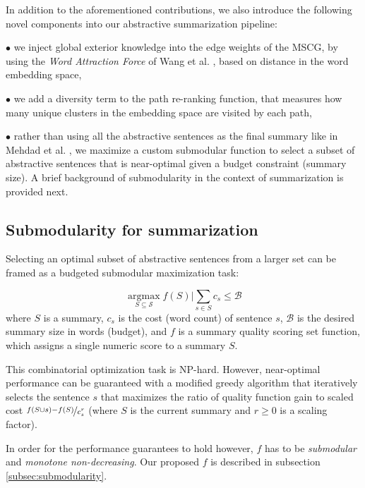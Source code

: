 \documentclass[11pt,a4paper]{article}
\begin{document}
\vspace{-.3cm}

In addition to the aforementioned contributions, we also introduce the following novel components into our abstractive summarization pipeline:

$\bullet$ we inject global exterior knowledge into the edge weights of the MSCG, by using the \textit{Word Attraction Force} of Wang et al. , based on distance in the word embedding space,

$\bullet$ we add a diversity term to the path re-ranking function, that measures how many unique clusters in the embedding space are visited by each path,

$\bullet$ rather than using all the abstractive sentences as the final summary like in Mehdad et al. , we maximize a custom submodular function to select a subset of abstractive sentences that is near-optimal given a budget constraint (summary size). A brief background of submodularity in the context of summarization is provided next.

\subsection{Submodularity for summarization \cite{lin2010multi,lin2012submodularity}}\label{sub:rel_sub}
Selecting an optimal subset of abstractive sentences from a larger set can be framed as a budgeted submodular maximization task:

\begin{equation}
\operatorname*{argmax}_{S \subseteq \mathcal{S}} f(S) | \sum_{s \in S} c_s\leq \mathcal{B}
\end{equation}
where $S$ is a summary, $c_s$ is the cost (word count) of sentence $s$, $\mathcal{B}$ is the desired summary size in words (budget), and $f$ is a summary quality scoring set function, which assigns a single numeric score to a summary $S$.

This combinatorial optimization task is NP-hard. However, near-optimal performance can be guaranteed with a modified greedy algorithm \cite{lin2010multi} that iteratively selects the sentence $s$ that maximizes the ratio of quality function gain to scaled cost $\nicefrac{f(S \cup s)-f(S)}{c^r_s}$ (where $S$ is the current summary and $r \geq 0$ is a scaling factor).

In order for the performance guarantees to hold however, $f$ has to be \textit{submodular} and \textit{monotone non-decreasing}. Our proposed $f$ is described in subsection \ref{subsec:submodularity}.
\end{document}
